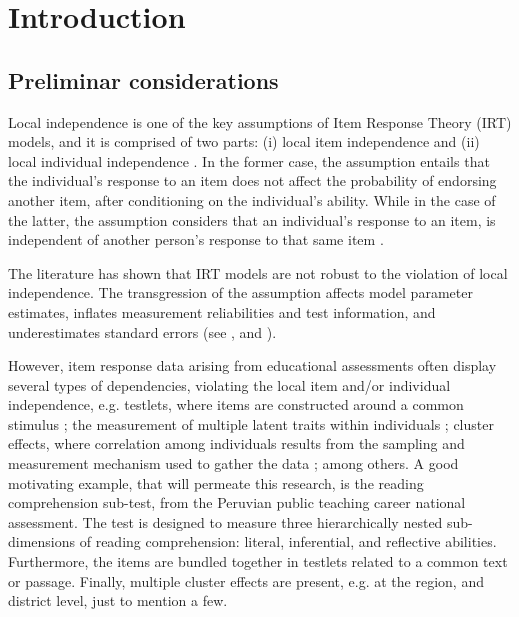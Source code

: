\chapter{Introduction}

\section{Preliminar considerations}

Local independence is one of the key assumptions of Item Response Theory (IRT) models, and it is comprised of two parts: (i) local item independence and (ii) local individual independence \cite{Baker_2001, Hambleton_et_al_1991a}. In the former case, the assumption entails that the individual's response to an item does not affect the probability of endorsing another item, after conditioning on the individual's ability. While in the case of the latter, the assumption considers that an individual's response to an item, is independent of another person's response to that same item \cite{Reckase_2009}. 

The literature has shown that IRT models are not robust to the violation of local independence. The transgression of the assumption affects model parameter estimates, inflates measurement reliabilities and test information, and underestimates standard errors (see \citet{Yen_1984, Chen_et_al_1997}, and  \citet{Jiao_et_al_2012}). 

However, item response data arising from educational assessments often display several types of dependencies, violating the local item and/or individual independence, e.g. testlets, where items are constructed around a common stimulus \cite{Wainer_et_al_2007}; the measurement of multiple latent traits within individuals \cite{Reckase_2009}; cluster effects, where correlation among individuals results from the sampling and measurement mechanism used to gather the data \cite{Raudenbush_et_al_2002}; among others. A good motivating example, that will permeate this research, is the reading comprehension sub-test, from the Peruvian public teaching career national assessment. The test is designed to measure three hierarchically nested sub-dimensions of reading comprehension: literal, inferential, and reflective abilities. Furthermore, the items are bundled together in testlets related to a common text or passage. Finally, multiple cluster effects are present, e.g. at the region, and district level, just to mention a few.

